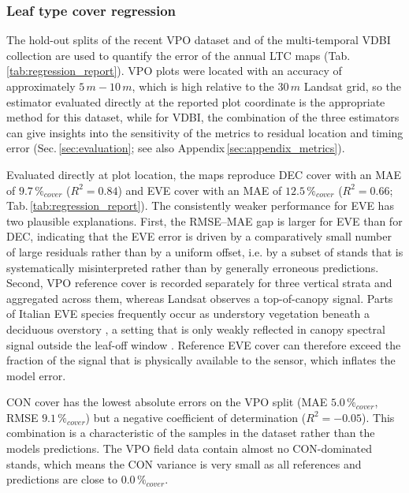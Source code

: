 \documentclass[essd, manuscript]{copernicus}
\begin{document}
\subsubsection{Leaf type cover regression}

The hold-out splits of the recent VPO dataset and of the multi-temporal VDBI collection are used to quantify the error of the annual LTC maps (Tab.\,\ref{tab:regression_report}). VPO plots were located with an accuracy of approximately $5\,\unit{m} - 10\,\unit{m}$, which is high relative to the $30\,\unit{m}$ Landsat grid, so the estimator evaluated directly at the reported plot coordinate is the appropriate method for this dataset, while for VDBI, the combination of the three estimators can give insights into the sensitivity of the metrics to residual location and timing error (Sec.\,\ref{sec:evaluation}; see also Appendix\,\ref{sec:appendix_metrics}).

Evaluated directly at plot location, the maps reproduce DEC cover with an MAE of $9.7\,\%_{cover}$ ($R^2 = 0.84$) and EVE cover with an MAE of $12.5\,\%_{cover}$ ($R^2 = 0.66$; Tab.\,\ref{tab:regression_report}). The consistently weaker performance for EVE has two plausible explanations. First, the RMSE--MAE gap is larger for EVE than for DEC, indicating that the EVE error is driven by a comparatively small number of large residuals rather than by a uniform offset, i.e. by a subset of stands that is systematically misinterpreted rather than by generally erroneous predictions. Second, VPO reference cover is recorded separately for three vertical strata and aggregated across them, whereas Landsat observes a top-of-canopy signal. Parts of Italian EVE species frequently occur as understory vegetation beneath a deciduous overstory \citep{conedera_drivers_2018,alessi_ancient_2019}, a setting that is only weakly reflected in canopy spectral signal outside the leaf-off window \citep{chastain_use_2007, yang_mapping_2023}. Reference EVE cover can therefore exceed the fraction of the signal that is physically available to the sensor, which inflates the model error.

CON cover has the lowest absolute errors on the VPO split (MAE $5.0\,\%_{cover}$, RMSE $9.1\,\%_{cover}$) but a negative coefficient of determination ($R^2 = -0.05$). This combination is a characteristic of the samples in the dataset rather than the models predictions. The VPO field data contain almost no CON-dominated stands, which means the CON variance is very small as all references and predictions are close to $0.0\,\%_{cover}$.
\end{document}
